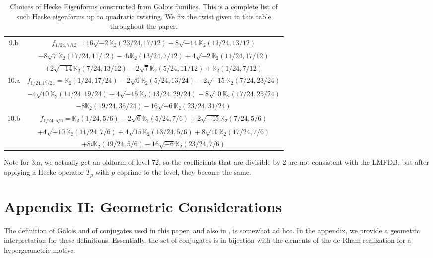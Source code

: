 \documentclass[12pt]{amsart}
\theoremstyle{definition}
\theoremstyle{remark}
\begin{document}
\begin{table}[ht]
\begin{tabular}{c|c}
        9.b  & $f_{1/24,7/12}=16 \sqrt{-2} \mathbb{K}_2(23/24, 17/12) + 8 \sqrt{-14} \mathbb{K}_2(19/24, 13/12)$\\& $ + 8 \sqrt{7} \mathbb{K}_2(17/24, 11/12)  - 4 i \mathbb{K}_2(13/24, 7/12)  + 4 \sqrt{-2} \mathbb{K}_2(11/24, 17/12) $\\& $+ 2  \sqrt{-14} \mathbb{K}_2(7/24, 13/12)  - 2 \sqrt{7} \mathbb{K}_2(5/24, 11/12) + \mathbb{K}_2(1/24, 7/12)$\\\hline
     10.a &   $f_{1/24,17/24}=\mathbb{K}_2(1/24, 17/24) - 2 \sqrt{6} \mathbb{K}_2(5/24, 13/24) - 2 \sqrt{-15} \mathbb{K}_2(7/24, 23/24) $\\&$ - 4 \sqrt{10}\mathbb{K}_2(11/24, 19/24)  +  4 \sqrt{-15} \mathbb{K}_2(13/24, 29/24) - 8 \sqrt{10} \mathbb{K}_2(17/24, 25/24) $\\&$ - 
 8 \mathbb{K}_2(19/24, 35/24)  - 16 \sqrt{-6} \mathbb{K}_2(23/24, 31/24)$\\\hline
10.b &  $f_{1/24,5/6}=\mathbb{K}_2(1/24, 5/6) - 2 \sqrt{6} \mathbb{K}_2(5/24, 7/6) + 2 \sqrt{-15} \mathbb{K}_2(7/24, 5/6)$\\&$ + 4 \sqrt{-10} \mathbb{K}_2(11/24, 7/6)  + 4 \sqrt{15} \mathbb{K}_2(13/24, 5/6) + 8 \sqrt{10}
   \mathbb{K}_2(17/24, 7/6) $\\&$+8 i \mathbb{K}_2(19/24, 5/6) -16 \sqrt{-6} \mathbb{K}_2(23/24, 
   7/6)$\\\hline
  
    \end{tabular}
    \caption{Choices of Hecke Eigenforms constructed from Galois families. This is a complete list of such Hecke eigenforms up to quadratic twisting. We fix the twist given in this table throughout the paper.}
    \label{tab:my_label}
\end{table}
Note for 3.a, we actually get an oldform of level 72, so the coefficients that are divisible by 2 are not consistent with the LMFDB, but after applying a Hecke operator $T_p$ with $p$ coprime to the level, they become the same.  

 \section{Appendix II: Geometric Considerations}

The definition of Galois and of conjugates used in this paper, and also in \cite{aglt}, is somewhat ad hoc. In the appendix, we provide a geometric interpretation for these definitions. Essentially, the set of conjugates is in bijection with the elements of the de Rham realization for a hypergeometric motive.
\end{document}
